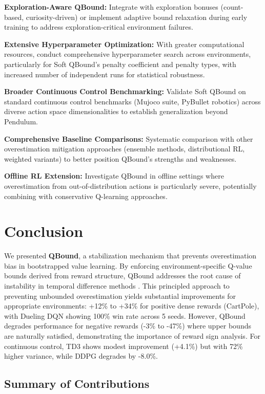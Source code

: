 \documentclass[11pt]{article}
\theoremstyle{definition}
\theoremstyle{remark}
\begin{document}
\textbf{Exploration-Aware QBound:} Integrate with exploration bonuses (count-based, curiosity-driven) or implement adaptive bound relaxation during early training to address exploration-critical environment failures.

\textbf{Extensive Hyperparameter Optimization:} With greater computational resources, conduct comprehensive hyperparameter search across environments, particularly for Soft QBound's penalty coefficient and penalty types, with increased number of independent runs for statistical robustness.

\textbf{Broader Continuous Control Benchmarking:} Validate Soft QBound on standard continuous control benchmarks (Mujoco suite, PyBullet robotics) across diverse action space dimensionalities to establish generalization beyond Pendulum.

\textbf{Comprehensive Baseline Comparisons:} Systematic comparison with other overestimation mitigation approaches (ensemble methods, distributional RL, weighted variants) to better position QBound's strengths and weaknesses.

\textbf{Offline RL Extension:} Investigate QBound in offline settings where overestimation from out-of-distribution actions is particularly severe, potentially combining with conservative Q-learning approaches.

\section{Conclusion}

We presented \textbf{QBound}, a stabilization mechanism that prevents overestimation bias in bootstrapped value learning. By enforcing environment-specific Q-value bounds derived from reward structure, QBound addresses the root cause of instability in temporal difference methods \citep{sutton2018reinforcement, thrun1993issues}. This principled approach to preventing unbounded overestimation yields substantial improvements for appropriate environments: +12\% to +34\% for positive dense rewards (CartPole), with Dueling DQN showing 100\% win rate across 5 seeds. However, QBound degrades performance for negative rewards (-3\% to -47\%) where upper bounds are naturally satisfied, demonstrating the importance of reward sign analysis. For continuous control, TD3 shows modest improvement (+4.1\%) but with 72\% higher variance, while DDPG degrades by -8.0\%.

\subsection{Summary of Contributions}
\end{document}
